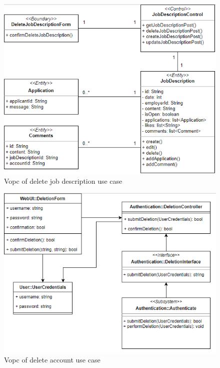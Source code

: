\documentclass[a4paper]{article}
\begin{document}
\begin{figure}[H]
  \centering
  \includegraphics[width=1.0\textwidth]{vopc_del_jd.png}
  \caption{Vopc of delete job description use case}
  \label{fig:fig29}
\end{figure}

\begin{figure}[H]
  \centering
  \includegraphics[width=1.0\textwidth]{vopc_delacc.png}
  \caption{Vopc of delete account use case}
  \label{fig:fig30}
\end{figure}
\end{document}
